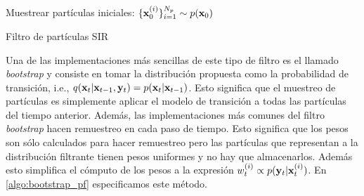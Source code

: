\begin{algorithm}[H]\label{algo:sir_pf}    
    Muestrear partículas iniciales: $\{\mathbf{x}_0^{(i)}\}_{i=1}^{N_p} \sim p(\mathbf{x}_0)$
    
\caption{Filtro de partículas SIR}
\end{algorithm}

Una de las implementaciones más sencillas de este tipo de filtro es el llamado \textit{bootstrap} \citep{Gordon1993} y consiste en tomar la distribución propuesta como la probabilidad de transición, i.e., $q(\mathbf{x}_t | \mathbf{x}_{t-1}, \mathbf{y}_t) = p(\mathbf{x}_t | \mathbf{x}_{t-1})$. Esto significa que el muestreo de partículas es simplemente aplicar el modelo de transición a todas las partículas del tiempo anterior. Además, las implementaciones más comunes del filtro \textit{bootstrap} hacen remuestreo en cada paso de tiempo. Esto significa que los pesos son sólo calculados para hacer remuestreo pero las partículas que representan a la distribución filtrante tienen pesos uniformes y no hay que almacenarlos. Además esto simplifica el cómputo de los pesos a la expresión $w_{t}^{(i)} \propto p(\mathbf{y}_t | \mathbf{x}_t^{(i)})$. En \ref{algo:bootstrap_pf} especificamos este método.

